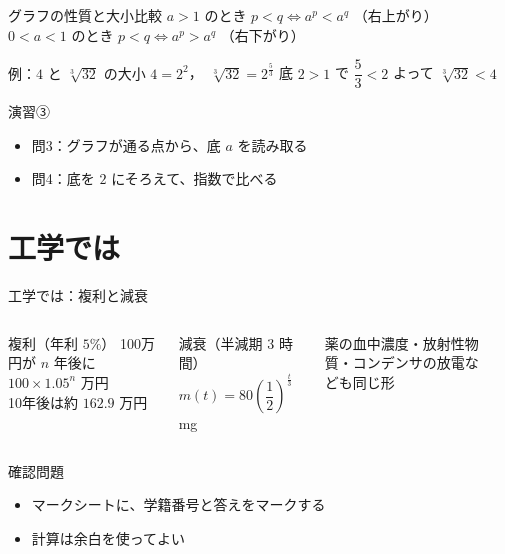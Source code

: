 \documentclass[aspectratio=169]{beamer}
\begin{document}
\begin{frame}{グラフの性質と大小比較}
  \medskip
  $a > 1$ のとき \quad $p < q \iff a^p < a^q$ \quad （右上がり）\\[0.5ex]
  $0 < a < 1$ のとき \quad $p < q \iff a^p > a^q$ \quad （右下がり）
  \begin{block}{例：$4$ と $\sqrt[3]{32}$ の大小}
    $4 = 2^2$，\ $\sqrt[3]{32} = 2^{\frac53}$ \quad 底 $2 > 1$ で $\dfrac53 < 2$ \quad
    よって $\sqrt[3]{32} < 4$
  \end{block}
\end{frame}

\begin{frame}{演習③}
  \bigskip
  \begin{itemize}
    \item 問3：グラフが通る点から、底 $a$ を読み取る
    \item 問4：底を $2$ にそろえて、指数で比べる
  \end{itemize}
\end{frame}

\section{工学では}

\begin{frame}{工学では：複利と減衰}
  \begin{columns}[c]
      \begin{block}{複利（年利 $5\%$）}
        100万円が $n$ 年後に $100 \times 1.05^n$ 万円\\
        10年後は約 $162.9$ 万円
      \end{block}
      \begin{block}{減衰（半減期 3 時間）}
        $m(t) = 80 \left(\dfrac12\right)^{\frac{t}{3}}$ mg
      \end{block}
      {\small 薬の血中濃度・放射性物質・コンデンサの放電なども同じ形}
      \begin{center}
        
      \end{center}
  \end{columns}
\end{frame}

\begin{frame}{確認問題}
  \bigskip
  \begin{itemize}
    \item マークシートに、学籍番号と答えをマークする
    \item 計算は余白を使ってよい
  \end{itemize}
\end{frame}
\end{document}
